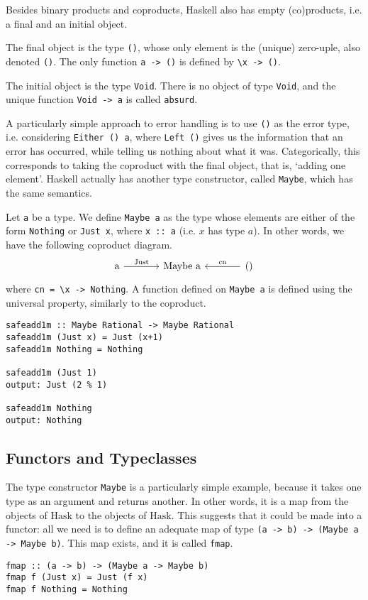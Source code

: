 \documentclass[11pt]{article}
\theoremstyle{nonumberplain}
\newcommand{\Hask}{\mathrm{Hask}}
\newcommand*\lsin{\lstinline}
\newcommand*\lsmath[1]{\text{\lstinline|#1|}}
\begin{document}
Besides binary products and coproducts, Haskell also has empty (co)products, i.e. a final and an initial object.

The final object is the type \lsin|()|, whose only element is the (unique) zero-uple, also denoted \lsin|()|. The only function \lsin|a -> ()| is defined by \lsin|\x -> ()|.

The initial object is the type \lsin|Void|. There is no object of type \lsin|Void|, and the unique function \lsin|Void -> a| is called \lsin|absurd|.

A particularly simple approach to error handling is to use \lsin|()| as the error type, i.e. considering \lsin|Either () a|, where \lsin|Left ()| gives us the information that an error has occurred, while telling us nothing about what it was. Categorically, this corresponds to taking the coproduct with the final object, that is, `adding one element'. Haskell actually has another type constructor, called \lsin|Maybe|, which has the same semantics.

Let \lsin|a| be a type. We define \lsin|Maybe a| as the type whose elements are either of the form \lsin|Nothing| or \lsin|Just x|, where \lsin|x :: a| (i.e. $x$ has type $a$). In other words, we have the following coproduct diagram.
\begin{equation}
\begin{tikzcd}[column sep = large]
\lsmath{a} \arrow[r, "\lsmath{Just}"] & \lsmath{Maybe a} & \lsmath{()} \arrow[l, "\lsmath{cn}"']
\end{tikzcd}
\end{equation}
where \lsin|cn = \x -> Nothing|. A function defined on \lsin|Maybe a| is defined using the universal property, similarly to the coproduct.
\begin{lstlisting}
safeadd1m :: Maybe Rational -> Maybe Rational
safeadd1m (Just x) = Just (x+1)
safeadd1m Nothing = Nothing
              
safeadd1m (Just 1)
output: Just (2 % 1)

safeadd1m Nothing
output: Nothing
\end{lstlisting}

\subsection{Functors and Typeclasses}\label{sec:functors}

The type constructor \lsin|Maybe| is a particularly simple example, because it takes one type as an argument and returns another. In other words, it is a map from the objects of $\Hask$ to the objects of $\Hask$. This suggests that it could be made into a functor: all we need is to define an adequate map of type \lsin|(a -> b) -> (Maybe a -> Maybe b)|. This map exists, and it is called \lsin|fmap|.
\begin{lstlisting}
fmap :: (a -> b) -> (Maybe a -> Maybe b)
fmap f (Just x) = Just (f x)
fmap f Nothing = Nothing
\end{lstlisting}
\end{document}
